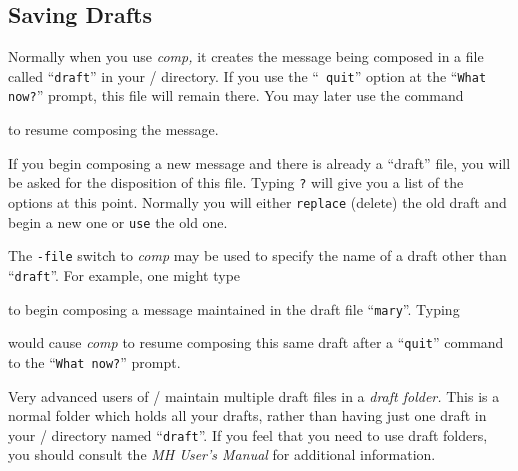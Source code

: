 \subsection{Saving Drafts}

Normally when you use {\it comp,} it creates the message being composed in a
file called ``{\tt draft}'' in your \MH/ directory. If you use the ``{\tt
quit}'' option at the ``{\tt What now?}'' prompt, this file will remain
there.  You may later use the command


to resume composing the message.

If you begin composing a new message and there is already a ``draft'' file,
you will be asked for the disposition of this file.  Typing {\tt?}
 will give you a list of the options at this point.  Normally
you will either {\tt replace} (delete) the old draft and begin
a new one or {\tt use} the old one.

The {\tt -file} switch to {\it comp\/} may be used to specify the name of a
draft other than ``{\tt draft}''.  For example, one might type


to begin composing a message maintained in the draft file ``{\tt mary}''.
Typing


would cause {\it comp\/} to resume composing this same draft after a
``{\tt quit}'' command to the ``{\tt What now?}'' prompt.

Very advanced users of \MH/ maintain multiple draft files in a {\it draft
folder.}  This is a normal folder which holds all your drafts, rather than
having just one draft in your \MH/ directory named ``{\tt draft}''.  If you
feel that you need to use draft folders, you should consult the {\sl MH
User's Manual\/} for additional information.


